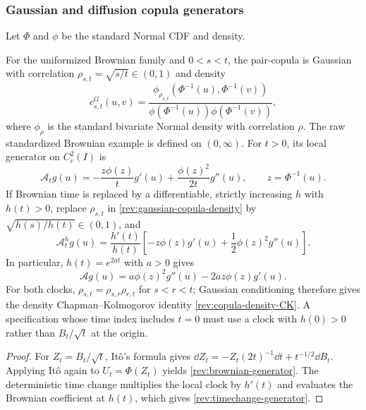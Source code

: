 \subsubsection{Gaussian and diffusion copula generators}

Let $\Phi$ and $\phi$ be the standard Normal CDF and density.

\begin{proposition}
\label{rev:prop-gaussian-generator}
For the uniformized Brownian family and $0<s<t$, the pair-copula is Gaussian
with correlation $\rho_{s,t}=\sqrt{s/t}\in(0,1)$ and density
\begin{equation}
c^{G}_{s,t}(u,v)=
\frac{\phi_{\rho_{s,t}}\!\left(\Phi^{-1}(u),\Phi^{-1}(v)\right)}
     {\phi\!\left(\Phi^{-1}(u)\right)\phi\!\left(\Phi^{-1}(v)\right)},
\label{rev:gaussian-copula-density}
\end{equation}
where $\phi_\rho$ is the standard bivariate Normal density with correlation
$\rho$.  The raw standardized Brownian example is defined on $(0,\infty)$.
For $t>0$, its local generator on $C_c^2(I)$ is
\begin{equation}
\mathcal A_tg(u)=
-\frac{z\phi(z)}{t}g'(u)+\frac{\phi(z)^2}{2t}g''(u),
\qquad z=\Phi^{-1}(u).
\label{rev:brownian-generator}
\end{equation}
If Brownian time is replaced by a differentiable, strictly increasing $h$ with
$h(t)>0$, replace $\rho_{s,t}$ in \eqref{rev:gaussian-copula-density} by
$\sqrt{h(s)/h(t)}\in(0,1)$, and
\begin{equation}
\mathcal A_t^hg(u)=\frac{h'(t)}{h(t)}
\left[-z\phi(z)g'(u)+\frac12\phi(z)^2g''(u)\right].
\label{rev:timechange-generator}
\end{equation}
In particular, $h(t)=e^{2at}$ with $a>0$ gives
\begin{equation}
\mathcal A g(u)=a\phi(z)^2g''(u)-2az\phi(z)g'(u).
\label{rev:stationary-gaussian-generator}
\end{equation}
For both clocks,
$\rho_{s,t}=\rho_{s,r}\rho_{r,t}$ for $s<r<t$; Gaussian conditioning therefore
gives the density Chapman--Kolmogorov identity
\eqref{rev:copula-density-CK}.  A specification whose time index includes
$t=0$ must use a clock with $h(0)>0$ rather than $B_t/\sqrt t$ at the origin.
\end{proposition}

\begin{proof}
For $Z_t=B_t/\sqrt t$, It\^o's formula gives
$\dd Z_t=-Z_t(2t)^{-1}\dd t+t^{-1/2}\dd B_t$.  Applying It\^o again to
$U_t=\Phi(Z_t)$ yields \eqref{rev:brownian-generator}.  The deterministic
time change multiplies the local clock by $h'(t)$ and evaluates the Brownian
coefficient at $h(t)$, which gives \eqref{rev:timechange-generator}.
\end{proof}


